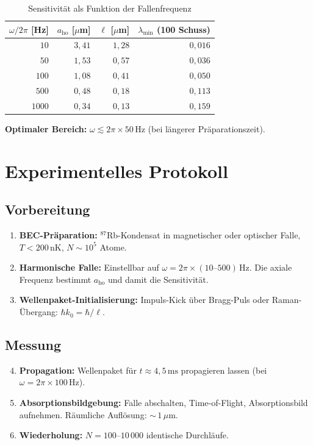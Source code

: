 \documentclass[a4paper,11pt]{article}
\begin{document}
\begin{table}[h]
\centering
\caption{Sensitivität als Funktion der Fallenfrequenz}
\begin{tabular}{rrrr}
\toprule
$\omega / 2\pi$ [Hz] & $a_{\mathrm{ho}}$ [$\mu$m] & $\ell$ [$\mu$m]
  & $\lambda_{\min}$ (100 Schuss) \\
\midrule
$10$   & $3{,}41$ & $1{,}28$ & $0{,}016$ \\
$50$   & $1{,}53$ & $0{,}57$ & $0{,}036$ \\
$100$  & $1{,}08$ & $0{,}41$ & $0{,}050$ \\
$500$  & $0{,}48$ & $0{,}18$ & $0{,}113$ \\
$1000$ & $0{,}34$ & $0{,}13$ & $0{,}159$ \\
\bottomrule
\end{tabular}
\end{table}

\textbf{Optimaler Bereich:} $\omega \lesssim 2\pi \times 50\,\mathrm{Hz}$
(bei längerer Präparationszeit).

\section{Experimentelles Protokoll}

\subsection{Vorbereitung}

\begin{enumerate}
  \item \textbf{BEC-Präparation:} $^{87}$Rb-Kondensat in magnetischer oder
    optischer Falle, $T < 200\,\mathrm{nK}$, $N \sim 10^5$ Atome.
  \item \textbf{Harmonische Falle:} Einstellbar auf
    $\omega = 2\pi \times (10\text{--}500)\,\mathrm{Hz}$.
    Die axiale Frequenz bestimmt $a_{\mathrm{ho}}$ und damit die Sensitivität.
  \item \textbf{Wellenpaket-Initialisierung:} Impuls-Kick über Bragg-Puls
    oder Raman-Übergang: $\hbar k_0 = \hbar/\ell$.
\end{enumerate}

\subsection{Messung}

\begin{enumerate}
  \setcounter{enumi}{3}
  \item \textbf{Propagation:} Wellenpaket für $t \approx 4{,}5\,\mathrm{ms}$
    propagieren lassen (bei $\omega = 2\pi \times 100\,\mathrm{Hz}$).
  \item \textbf{Absorptionsbildgebung:} Falle abschalten, Time-of-Flight,
    Absorptionsbild aufnehmen. Räumliche Auflösung: ${\sim}\,1\,\mu\mathrm{m}$.
  \item \textbf{Wiederholung:} $N = 100\text{--}10\,000$ identische Durchläufe.
\end{enumerate}
\end{document}
